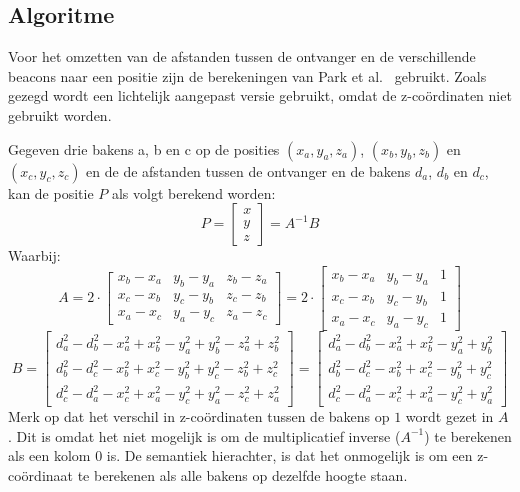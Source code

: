 \documentclass[a4paper,10pt]{article}
\begin{document}
\subsection{Algoritme} \label{sec:alg}
Voor het omzetten van de afstanden tussen de ontvanger en de verschillende beacons naar een positie zijn de berekeningen van Park et al.~\cite{park2011beacon} gebruikt. Zoals gezegd wordt een lichtelijk aangepast versie gebruikt, omdat de z-co\"ordinaten niet gebruikt worden.

Gegeven drie bakens a, b en c op de posities $(x_a, y_a, z_a)$, $(x_b, y_b, z_b)$ en $(x_c, y_c, z_c)$ en de de afstanden tussen de ontvanger en de bakens $d_a$, $d_b$ en $d_c$, kan de positie $P$ als volgt berekend worden:
$$P = 
    \begin{bmatrix}
        x\\
        y\\
        z
    \end{bmatrix}
    = A^{-1}B
$$
Waarbij:
$$A = 2 \cdot
    \begin{bmatrix}
        x_b - x_a & y_b - y_a & z_b - z_a \\
        x_c - x_b & y_c - y_b & z_c - z_b \\
        x_a - x_c & y_a - y_c & z_a - z_c
    \end{bmatrix}
    = 2 \cdot
    \begin{bmatrix}
        x_b - x_a & y_b - y_a & 1 \\
        x_c - x_b & y_c - y_b & 1 \\
        x_a - x_c & y_a - y_c & 1
    \end{bmatrix}
$$
$$B = 
    \begin{bmatrix}
        d_a^2 - d_b^2 - x_a^2 + x_b^2 - y_a^2 + y_b^2 - z_a^2 + z_b^2 \\
        d_b^2 - d_c^2 - x_b^2 + x_c^2 - y_b^2 + y_c^2 - z_b^2 + z_c^2 \\
        d_c^2 - d_a^2 - x_c^2 + x_a^2 - y_c^2 + y_a^2 - z_c^2 + z_a^2
    \end{bmatrix}
    =
    \begin{bmatrix}
        d_a^2 - d_b^2 - x_a^2 + x_b^2 - y_a^2 + y_b^2 \\
        d_b^2 - d_c^2 - x_b^2 + x_c^2 - y_b^2 + y_c^2 \\
        d_c^2 - d_a^2 - x_c^2 + x_a^2 - y_c^2 + y_a^2
    \end{bmatrix}
$$
Merk op dat het verschil in z-co\"ordinaten tussen de bakens op $1$ wordt gezet in $A$. Dit is omdat het niet mogelijk is om de multiplicatief inverse ($A^{-1}$) te berekenen als een kolom $0$ is. De semantiek hierachter, is dat het onmogelijk is om een z-co\"ordinaat te berekenen als alle bakens op dezelfde hoogte staan.
\end{document}

